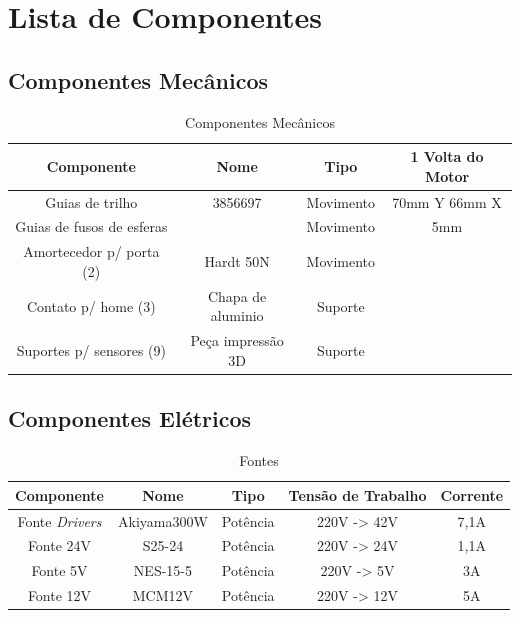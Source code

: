 \documentclass[
	article,			%
	11pt,				%
	oneside,			%
	a4paper,			%
	section=TITLE,		%
	english,			%
	brazil,				%
	sumario=tradicional
	]{abntex2}
\begin{document}
\section{Lista de Componentes}
\subsection{Componentes Mecânicos}

\begin{table}[H]
    \centering
    \begin{tabular}{c|c|c|c}
        \toprule
        Componente & Nome & Tipo & 1 Volta do Motor \\
        \midrule
        Guias de trilho & 3856697 & Movimento & 70mm Y 66mm X \\
        Guias de fusos de esferas  &  & Movimento &  5mm \\
        Amortecedor p/ porta (2) & Hardt 50N & Movimento & \\
        Contato p/ home (3) & Chapa de aluminio & Suporte & \\
        Suportes p/ sensores (9) & Peça impressão 3D & Suporte &  \\
        \bottomrule
     \end{tabular}
     \caption{Componentes Mecânicos}
     \label{tab:fontes}
 \end{table}
 
\subsection{Componentes Elétricos}
\begin{table}[H]
    \centering
    \begin{tabular}{c|c|c|c|c}
        \toprule
        Componente & Nome & Tipo & Tensão de Trabalho & Corrente\\
        \midrule
        Fonte \textit{Drivers} & Akiyama300W & Potência & 220V -> 42V & 7,1A \\
        Fonte 24V & S25-24 & Potência & 220V -> 24V & 1,1A \\
        Fonte 5V & NES-15-5 & Potência & 220V -> 5V & 3A \\
        Fonte 12V & MCM12V & Potência & 220V -> 12V & 5A \\
        \bottomrule
    \end{tabular}
    \caption{Fontes}
    \label{tab:fontes}
\end{table}
 
\end{document}
